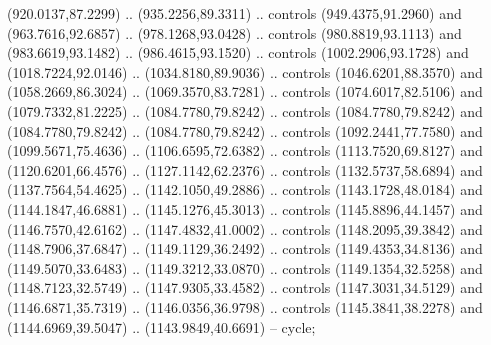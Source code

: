 \begin{scope}[shift={(-22.88722,-49.76189)}]
\begin{scope}[shift={(-739.46591,328.36782)}]
      (920.0137,87.2299) .. (935.2256,89.3311) .. controls (949.4375,91.2960) and
      (963.7616,92.6857) .. (978.1268,93.0428) .. controls (980.8819,93.1113) and
      (983.6619,93.1482) .. (986.4615,93.1520) .. controls (1002.2906,93.1728) and
      (1018.7224,92.0146) .. (1034.8180,89.9036) .. controls (1046.6201,88.3570) and
      (1058.2669,86.3024) .. (1069.3570,83.7281) .. controls (1074.6017,82.5106) and
      (1079.7332,81.2225) .. (1084.7780,79.8242) .. controls (1084.7780,79.8242) and
      (1084.7780,79.8242) .. (1084.7780,79.8242) .. controls (1092.2441,77.7580) and
      (1099.5671,75.4636) .. (1106.6595,72.6382) .. controls (1113.7520,69.8127) and
      (1120.6201,66.4576) .. (1127.1142,62.2376) .. controls (1132.5737,58.6894) and
      (1137.7564,54.4625) .. (1142.1050,49.2886) .. controls (1143.1728,48.0184) and
      (1144.1847,46.6881) .. (1145.1276,45.3013) .. controls (1145.8896,44.1457) and
      (1146.7570,42.6162) .. (1147.4832,41.0002) .. controls (1148.2095,39.3842) and
      (1148.7906,37.6847) .. (1149.1129,36.2492) .. controls (1149.4353,34.8136) and
      (1149.5070,33.6483) .. (1149.3212,33.0870) .. controls (1149.1354,32.5258) and
      (1148.7123,32.5749) .. (1147.9305,33.4582) .. controls (1147.3031,34.5129) and
      (1146.6871,35.7319) .. (1146.0356,36.9798) .. controls (1145.3841,38.2278) and
      (1144.6969,39.5047) .. (1143.9849,40.6691) -- cycle;


\end{scope}
\end{scope}
